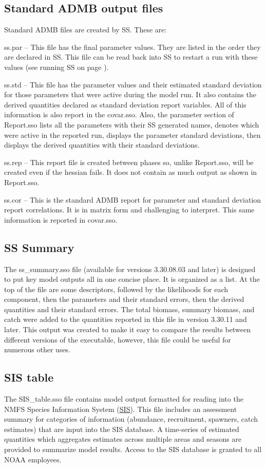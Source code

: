 \subsection{Standard ADMB output files}
Standard ADMB files are created by SS. These are:

ss.par – This file has the final parameter values.  They are listed in the order they are declared in SS.  This file can be read back into SS to restart a run with these values (see running SS on page \pageref{sec:RunningSS}).

ss.std – This file has the parameter values and their estimated standard deviation for those parameters that were active during the model run.  It also contains the derived quantities declared as standard deviation report variables.  All of this information is also report in the covar.sso.  Also, the parameter section of Report.sso lists all the parameters with their SS generated names, denotes which were active in the reported run, displays the parameter standard deviations, then displays the derived quantities with their standard deviations.

ss.rep – This report file is created between phases so, unlike Report.sso, will be created even if the hessian fails. It does not contain as much output as shown in Report.sso.

ss.cor – This is the standard ADMB report for parameter and standard deviation report correlations. It is in matrix form and challenging to interpret.  This same information is reported in covar.sso.

\subsection{SS Summary}
The ss\_summary.sso file (available for versions 3.30.08.03 and later) is designed to put key model outputs all in one concise place.  It is organized as a list.  At the top of the file are some descriptors, followed by the likelihoods for each component, then the parameters and their standard errors, then the derived quantities and their standard errors.  The total biomass, summary biomass, and catch were added to the quantities reported in this file in version 3.30.11 and later. This output was created to make it easy to compare the results between different versions of the executable, however, this file could be useful for numerous other uses. 

\subsection{SIS table}
The SIS\_table.sso file contains model output formatted for reading into the NMFS Species Information System (\href{https://www.st.nmfs.noaa.gov/sis/}{SIS}). This file includes an assessment summary for categories of information (abundance, recruitment, spawners, catch estimates) that are input into the SIS database. A time-series of estimated quantities which aggregates estimates across multiple areas and seasons are provided to summarize model results. Access to the SIS database is granted to all NOAA employees.


